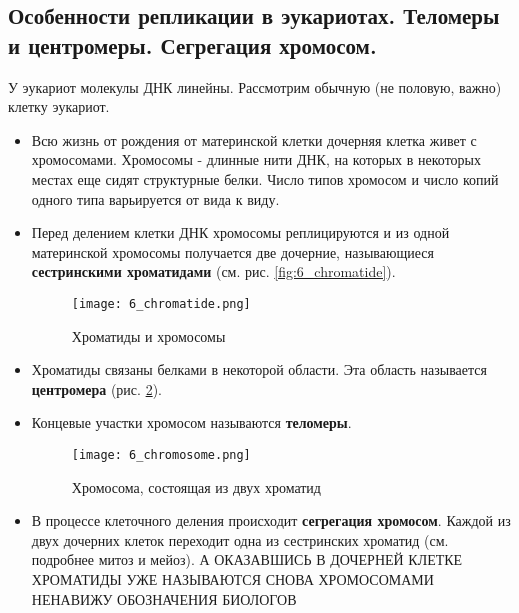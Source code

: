 \subsection{Особенности репликации в эукариотах. Теломеры и центромеры. Сегрегация хромосом.}

У эукариот молекулы ДНК линейны. Рассмотрим обычную (не половую, важно) клетку эукариот. 

\begin{itemize}
    \item Всю жизнь от рождения от материнской клетки дочерняя клетка живет с хромосомами. Хромосомы - длинные нити ДНК, на которых в некоторых местах еще сидят структурные белки. Число типов хромосом и число копий одного типа варьируется от вида к виду.
    
    \item Перед делением клетки ДНК хромосомы реплицируются и из одной материнской хромосомы получается две дочерние, называющиеся \textbf{сестринскими хроматидами} (см. рис. \ref{fig:6_chromatide}).
    
    \begin{figure}[h!]
        \centering
        \texttt{[image: 6\_chromatide.png]}
        \caption{Хроматиды и хромосомы}
        \label{fig:6_сhromatide}
    \end{figure}
    
    \item Хроматиды связаны белками в некоторой области. Эта область называется \textbf{центромера} (рис. \ref{fig:6_chromosome}).
    
    \item Концевые участки хромосом называются \textbf{теломеры}.
    
    \begin{figure}[h!]
        \centering
        \texttt{[image: 6\_chromosome.png]}
        \caption{Хромосома, состоящая из двух хроматид}
        \label{fig:6_chromosome}
    \end{figure}
    
    \item В процессе клеточного деления происходит \textbf{сегрегация хромосом}. Каждой из двух дочерних клеток переходит одна из сестринских хроматид (см. подробнее митоз и мейоз). А ОКАЗАВШИСЬ В ДОЧЕРНЕЙ КЛЕТКЕ ХРОМАТИДЫ УЖЕ НАЗЫВАЮТСЯ СНОВА ХРОМОСОМАМИ НЕНАВИЖУ ОБОЗНАЧЕНИЯ БИОЛОГОВ
\end{itemize}
